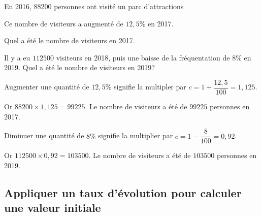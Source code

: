 \documentclass[11pt,a4paper]{book}
\begin{document}
\begin{bmethode}
    
    En 2016, 88200 personnes ont visité un parc d'attractions
    \begin{enumMet}
        \item Ce nombre de visiteurs a augmenté de $12,5\%$ en 2017.
        
        Quel a été le nombre de visiteurs en 2017.
        \item Il y a eu $112500$ visiteurs en 2018, puis une baisse de la fréquentation de $8\%$ en 2019. Quel a été le nombre de visiteurs en 2019? 
    \end{enumMet}
    
    \begin{enumMet}
        \item Augmenter une quantité de $12,5\%$ signifie la multipler par $c=1+\dfrac{12,5}{100}=1,125$.
        
        Or $88200\times1,125=99225$. Le nombre de visiteurs a été de $99225$ personnes en 2017.
        \item Diminuer une quantité de $8\%$ signifie la multiplier par $c=1-\dfrac{8}{100}=0,92$.
        
        Or $112500\times0,92=103500$. Le nombre de visiteurs a été de $103500$ personnes en 2019.
    \end{enumMet}
\end{bmethode}

\subsection{Appliquer un taux d'évolution pour calculer une valeur initiale}
\end{document}
